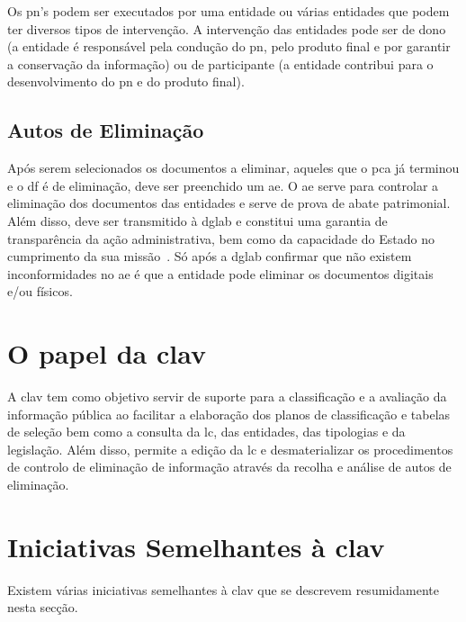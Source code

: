 Os \acrshort{pn}'s podem ser executados por uma entidade ou várias entidades que podem ter diversos tipos de intervenção. A intervenção das entidades pode ser de dono (a entidade é responsável pela condução do \acrshort{pn}, pelo produto final e por garantir a conservação da informação) ou de participante (a entidade contribui para o desenvolvimento do \acrshort{pn} e do produto final).

\subsection{Autos de Eliminação}

Após serem selecionados os documentos a eliminar, aqueles que o \acrshort{pca} já terminou e o \acrshort{df} é de eliminação, deve ser preenchido um \acrfull{ae}. O \acrshort{ae} serve para controlar a eliminação dos documentos das entidades e serve de prova de abate patrimonial. Além disso, deve ser transmitido à \acrshort{dglab} e constitui uma garantia de transparência da ação administrativa, bem como da capacidade do Estado no cumprimento da sua missão~\cite{pca}. Só após a \acrshort{dglab} confirmar que não existem inconformidades no \acrshort{ae} é que a entidade pode eliminar os documentos digitais e/ou físicos.

\section{O papel da \acrshort{clav}}

A \acrshort{clav} tem como objetivo servir de suporte para a classificação e a avaliação da informação pública ao facilitar a elaboração dos planos de classificação e tabelas de seleção bem como a consulta da \acrshort{lc}, das entidades, das tipologias e da legislação. Além disso, permite a edição da \acrshort{lc} e desmaterializar os procedimentos de controlo de eliminação de informação através da recolha e análise de autos de eliminação.

\section{Iniciativas Semelhantes à \acrshort{clav}}

Existem várias iniciativas semelhantes à \acrshort{clav} que se descrevem resumidamente nesta secção.


